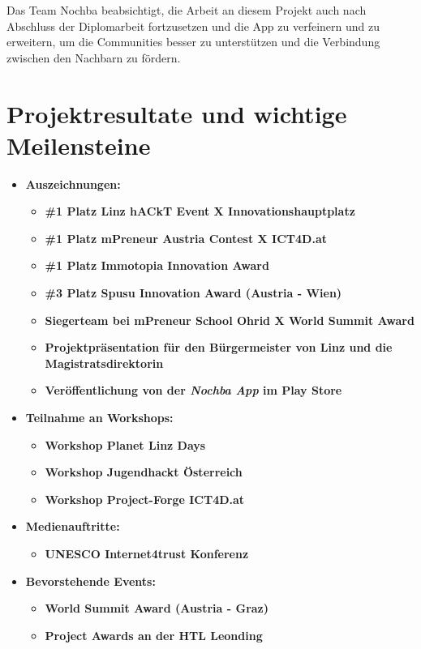 Das Team Nochba beabsichtigt, die Arbeit an diesem Projekt auch nach Abschluss der Diplomarbeit fortzusetzen und die App zu verfeinern und zu erweitern, um die Communities besser zu unterstützen und die Verbindung zwischen den Nachbarn zu fördern.

\section{Projektresultate und wichtige Meilensteine}

\begin{itemize}
    \item \textbf{Auszeichnungen:}
          \begin{itemize}
              \item \textbf{\#1 Platz Linz hACkT Event X Innovationshauptplatz}
              \item \textbf{\#1 Platz mPreneur Austria Contest X ICT4D.at}
              \item \textbf{\#1 Platz Immotopia Innovation Award}
              \item \textbf{\#3 Platz Spusu Innovation Award (Austria - Wien)}
              \item \textbf{Siegerteam bei mPreneur School Ohrid X World Summit Award}
              \item \textbf{Projektpräsentation für den Bürgermeister von Linz und die Magistratsdirektorin}
              \item \textbf{Veröffentlichung von der \textit{Nochba App} im Play Store}
          \end{itemize}
    \item \textbf{Teilnahme an Workshops:}
          \begin{itemize}
              \item \textbf{Workshop Planet Linz Days}
              \item \textbf{Workshop Jugendhackt Österreich}
              \item \textbf{Workshop Project-Forge ICT4D.at}
          \end{itemize}
    \item \textbf{Medienauftritte:}
          \begin{itemize}
              \item \textbf{UNESCO Internet4trust Konferenz}
          \end{itemize}
    \item \textbf{Bevorstehende Events:}
          \begin{itemize}
              \item \textbf{World Summit Award (Austria - Graz)}
              \item \textbf{Project Awards an der HTL Leonding}
          \end{itemize}
\end{itemize}


